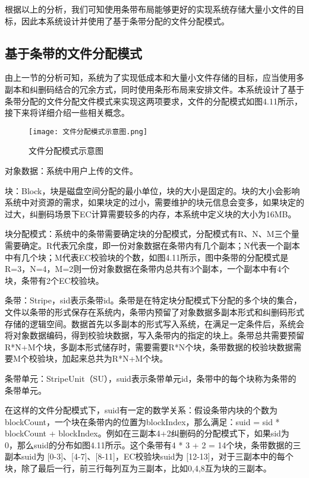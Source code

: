 根据以上的分析，我们可知使用条带布局能够更好的实现系统存储大量小文件的目标，因此本系统设计并使用了基于条带分配的文件分配模式。

\subsection{基于条带的文件分配模式}%
由上一节的分析可知，系统为了实现低成本和大量小文件存储的目标，应当使用多副本和纠删码结合的冗余方式，同时使用条形布局来安排文件。本系统设计了基于条带分配的文件分配文件模式来实现这两项要求，文件的分配模式如图4.11所示，接下来将详细介绍一些相关概念。

\begin{figure}[h]
    \centering
    \texttt{[image: 文件分配模式示意图.png]}
    \caption{文件分配模式示意图}
  \end{figure}

对象数据：系统中用户上传的文件。

块：Block，块是磁盘空间分配的最小单位，块的大小是固定的。块的大小会影响系统中对资源的需求，如果块定的过小，需要维护的块元信息会变多，如果块定的过大，纠删码场景下EC计算需要较多的内存，本系统中定义块的大小为16MB。

块分配模式：系统中的条带需要确定块的分配模式，分配模式有R、N、M三个量需要确定。R代表冗余度，即一份对象数据在条带内有几个副本；N代表一个副本中有几个块；M代表EC校验块的个数，如图4.11所示，图中条带的分配模式是R=3，N=4，M=2则一份对象数据在条带内总共有3个副本，一个副本中有4个块，条带有2个EC校验块。

条带：Stripe，sid表示条带id。条带是在特定块分配模式下分配的多个块的集合，文件以条带的形式保存在系统内，条带内预留了对象数据多副本形式和纠删码形式存储的逻辑空间。数据首先以多副本的形式写入系统，在满足一定条件后，系统会将对象数据编码，得到校验块数据，写入条带内的指定的块上。条带总共需要预留R*N+M个块，多副本形式储存时，需要需要R*N个块，条带数据的校验块数据需要M个校验块，加起来总共为R*N+M个块。

条带单元：StripeUnit（SU），suid表示条带单元id，条带中的每个块称为条带的条带单元。

在这样的文件分配模式下，suid有一定的数学关系：假设条带内块的个数为blockCount，一个块在条带内的位置为blockIndex，那么满足：suid = sid * blockCount + blockIndex。例如在三副本4+2纠删码的分配模式下，如果sid为 0，那么suid的分布如图4.11所示。这个条带有4 * 3 + 2 = 14个块，条带数据的三副本suid为 [0-3]、[4-7]、[8-11]，EC校验块suid为 [12-13]，对于三副本中的每个块，除了最后一行，前三行每列互为三副本，比如0,4,8互为块的三副本。

